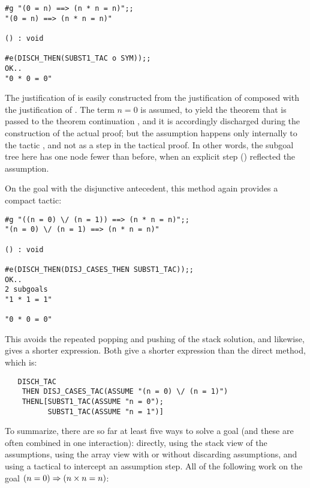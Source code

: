 \setcounter{sessioncount}{1}
\begin{session}\begin{verbatim}
#g "(0 = n) ==> (n * n = n)";;
"(0 = n) ==> (n * n = n)"

() : void

#e(DISCH_THEN(SUBST1_TAC o SYM));;
OK..
"0 * 0 = 0"
\end{verbatim}\end{session}

The justification of  is easily constructed
from the justification of  composed with the justification of
. 
The term $n=0$ is assumed, to yield the
theorem that is passed to the theorem continuation ,
and it is accordingly discharged during the construction of the
actual proof; but the assumption happens
only internally
 to the tactic , and not
as a step in the tactical proof.  In other words, the subgoal tree here
has one node fewer than before, when an explicit step ()
reflected the assumption.

On the goal with the disjunctive antecedent, this method again
provides a compact tactic:

\setcounter{sessioncount}{1}
\begin{session}\begin{verbatim}
#g "((n = 0) \/ (n = 1)) ==> (n * n = n)";;
"(n = 0) \/ (n = 1) ==> (n * n = n)"

() : void

#e(DISCH_THEN(DISJ_CASES_THEN SUBST1_TAC));;
OK..
2 subgoals
"1 * 1 = 1"

"0 * 0 = 0"
\end{verbatim}\end{session}

\noindent This avoids the repeated popping and pushing of the stack
solution, and likewise, gives a shorter \ML{} expression. Both give
a shorter expression than the direct method, which is:

\begin{hol}\begin{verbatim}
   DISCH_TAC
    THEN DISJ_CASES_TAC(ASSUME "(n = 0) \/ (n = 1)")
    THENL[SUBST1_TAC(ASSUME "n = 0");
          SUBST1_TAC(ASSUME "n = 1")]
\end{verbatim}\end{hol}

To summarize, there are so far at least five ways to solve a goal
(and these are often combined in one interaction):
directly, using the stack view of the assumptions,
using the array view with or without discarding assumptions, and using a
tactical to intercept an assumption step.  All of the following work
on the goal $(n=0) \Rightarrow (n \times n = n)$:

